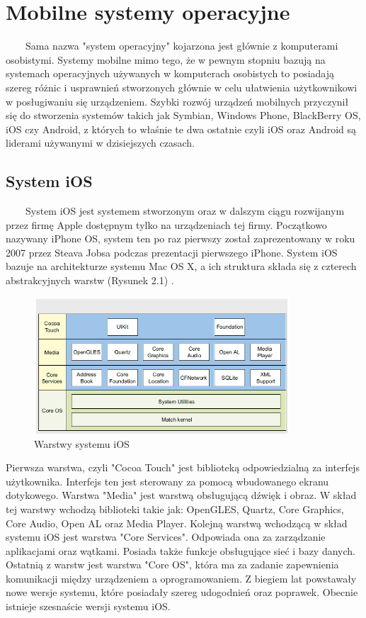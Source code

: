 \documentclass[a4paper,12pt,oneside]{book}
\begin{document}
	\section{Mobilne systemy operacyjne}
	\ \ \ \
	Sama nazwa "system operacyjny" kojarzona jest głównie z komputerami osobistymi. Systemy mobilne mimo tego, że w pewnym stopniu bazują na systemach operacyjnych używanych w komputerach osobistych to posiadają szereg różnic i usprawnień stworzonych głównie w celu ułatwienia użytkownikowi w posługiwaniu się urządzeniem. Szybki rozwój urządzeń mobilnych przyczynił się do stworzenia systemów takich jak Symbian, Windows Phone, BlackBerry OS, iOS czy Android, z których to właśnie te dwa ostatnie czyli iOS oraz Android są liderami używanymi w dzisiejszych czasach.
	
	\subsection{System iOS}
	\ \ \ \
	System iOS jest systemem stworzonym oraz w dalszym ciągu rozwijanym przez firmę Apple dostępnym tylko na urządzeniach tej firmy. Początkowo nazywany iPhone OS, system ten po raz pierwszy został zaprezentowany w roku 2007 przez Steava Jobsa podczas prezentacji pierwszego iPhone. System iOS bazuje na architekturze systemu Mac OS X, a ich struktura składa się z czterech abstrakcyjnych warstw (Rysunek 2.1) \cite{ref10}.
	
	\newpage
	
	\begin{figure}[h]
		\centering
		\includegraphics[width=0.85\textwidth]{grafika/warstwy_ios.png}
		\caption{Warstwy systemu iOS}
	\end{figure}

	Pierwsza warstwa, czyli "Cocoa Touch" jest biblioteką odpowiedzialną za interfejs użytkownika. Interfejs ten jest sterowany za pomocą wbudowanego ekranu dotykowego. Warstwa "Media" jest warstwą obsługującą dźwięk i obraz. W skład tej warstwy wchodzą biblioteki takie jak: OpenGLES, Quartz, Core Graphics, Core Audio, Open AL oraz Media Player. Kolejną warstwą wchodzącą w skład systemu iOS jest warstwa "Core Services". Odpowiada ona za zarządzanie aplikacjami oraz wątkami. Posiada także funkcje obsługujące sieć i bazy danych. Ostatnią z warstw jest warstwa "Core OS", która ma za zadanie zapewnienia komunikacji między urządzeniem a oprogramowaniem. Z biegiem lat powstawały nowe wersje systemu, które posiadały szereg udogodnień oraz poprawek. Obecnie istnieje szesnaście wersji systemu iOS. 
	
\end{document}
